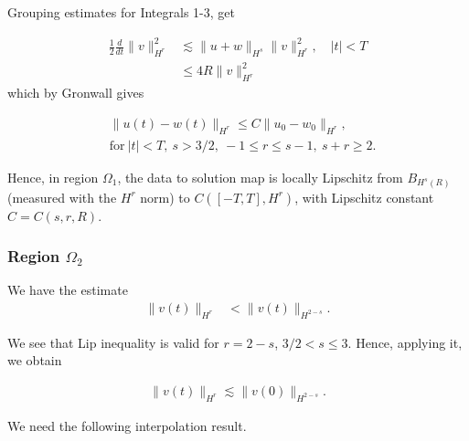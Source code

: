 \documentclass[handout]{beamer}
\numberwithin{equation}{section}
\begin{document}
\begin{frame}
Grouping estimates for Integrals 1-3, get


\begin{equation*}
\begin{split}
\frac{1}{2} \frac{d}{dt}
\|v\|_{H^r}^2
& \lesssim \|u+w\|_{H^s}
\|v\|_{H^r}^2, \quad | t | < T
\\
& \le 4R \| v \|_{H^{r}}^{2}
\label{9v}
\end{split}
\end{equation*}
which by Gronwall gives

\begin{equation*}
  \label{lip-ineq}
\begin{split}
  & \| u(t) - w(t) \|_{H^{r}} \le C \| u_{0} - w_{0} \|_{H^{r}}, 
  \\
  & \text{for} \ | t | < T,
  \ s > 3/2, \ -1 \le r \le s-1, \ s + r \ge 2.
\end{split}
\end{equation*}

Hence, in region $\Omega_{1}$, the data to solution map is locally Lipschitz from
$B_{H^{s}(R)}$ (measured with the $H^{r}$
norm) to $C([-T, T], H^{r})$, with Lipschitz constant $C = C(s, r, R)$.

\end{frame}



\begin{frame}
\frametitle{Region $\Omega_{2}$} 

We have the estimate
\begin{equation*}
  \label{fgh}
\begin{split}
  \| v(t) \|_{H^{r}}
  & < \|v(t) \|_{H^{2-s}}.
    \end{split}
\end{equation*}

We see that Lip inequality is valid for $r = 2-s$, $3/2 < s \le 3$.
Hence, applying it, we obtain 




\begin{equation*}
\begin{split}
\| v(t) \|_{H^{r}}
 \lesssim \|v(0) \|_{H^{2-s}}.
\end{split}
\end{equation*}





We need the following interpolation
result. 
 \end{frame} 
\end{document}
